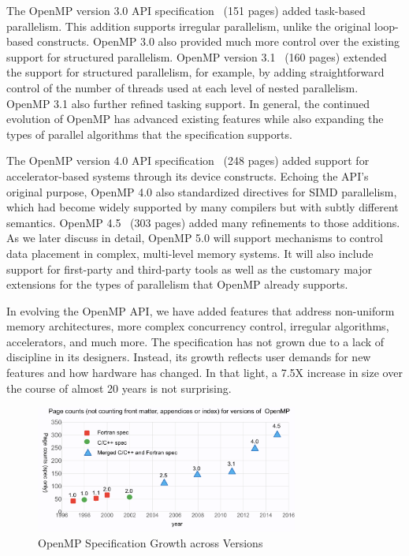 The OpenMP version 3.0 API specification~\cite{openmp3} (151 pages) added
task-based parallelism. This addition supports irregular parallelism, unlike 
the original loop-based constructs. OpenMP 3.0 also provided much more control
over the existing support for structured parallelism. OpenMP 
version 3.1~\cite{openmp31} (160 pages) extended the support for structured 
parallelism, for example, by adding straightforward control of the number of 
threads used at each level of nested parallelism. OpenMP 3.1 also further 
refined tasking support. In general, the continued evolution of OpenMP has 
advanced existing features while also expanding the types of parallel 
algorithms that the specification supports.

The OpenMP version 4.0 API specification~\cite{openmp4} (248 pages) added 
support for accelerator-based systems through its device constructs. Echoing 
the API's original purpose, OpenMP 4.0 also standardized directives for SIMD 
parallelism, which had become widely supported by many compilers but with 
subtly different semantics. OpenMP 4.5~\cite{openmp45} (303 pages) added many 
refinements to those additions. As we later discuss in detail, OpenMP 5.0 will
support mechanisms to control data placement in complex, multi-level memory 
systems. It will also include support for first-party and third-party tools 
as well as the customary major extensions for the types of parallelism that
OpenMP already supports.

In evolving the OpenMP API, we have added features that address 
non-uniform memory architectures, more complex concurrency control, 
irregular algorithms, accelerators, and much more. The specification 
has not grown due to a lack of discipline in its designers. Instead,
its growth reflects user demands for new features and how hardware 
has changed. In that light, a 7.5X increase in size over the course 
of almost 20 years is not surprising.

\begin{figure}
  \centering
  \includegraphics[width=3.4in]{pics/opcounts.png}
  \caption{OpenMP Specification Growth across Versions\label{omppcount}}
\end{figure}


